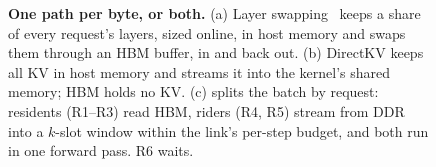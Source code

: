 \begin{figure}[t]
\caption{\textbf{One path per byte, or both.} (a) Layer swapping~\cite{pie} keeps a
share of every request's layers, sized online, in host memory and swaps them through an HBM buffer, in
and back out. (b) DirectKV keeps all KV in host memory and streams it into the
kernel's shared memory; HBM holds no KV. (c) \sysname{} splits the batch by
request: residents (R1--R3) read HBM, riders (R4, R5) stream from DDR into a
$k$-slot window within the link's per-step budget, and both run in one forward
pass. R6 waits.}
\label{fig:tiers}
\end{figure}

